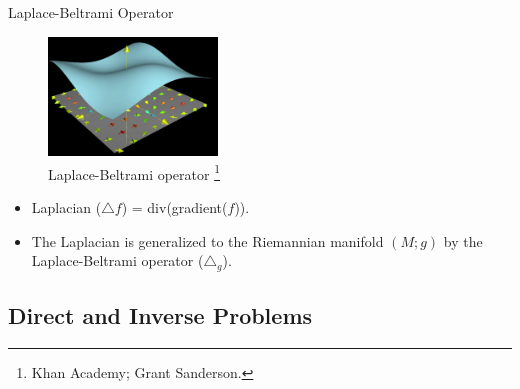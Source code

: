 \documentclass{beamer}
\begin{document}
\begin{frame}{Laplace-Beltrami Operator}


\begin{figure}
    \centering
    \includegraphics[width=0.4\textwidth]{laplacian.png}
    \caption{Laplace-Beltrami operator \footnote{Khan Academy; Grant Sanderson.}}
    \label{fig:laplacian}
\end{figure}

\begin{itemize}
  \item Laplacian ($ {\triangle} f $) = div(gradient($f$)).
  \item The Laplacian is generalized to the Riemannian manifold $ (M;g) $ by the Laplace-Beltrami operator ($ {\triangle}_g $).
\end{itemize}

\end{frame}

\subsection{Direct and Inverse Problems}
\end{document}
